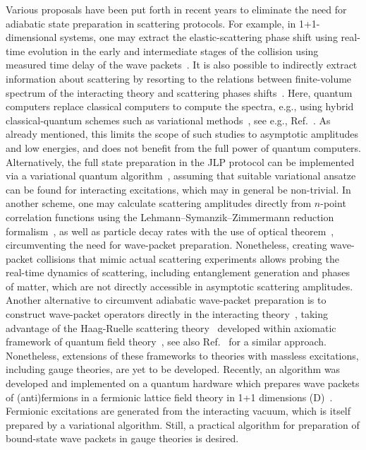 \documentclass[a4paper,onecolumn,11pt,accepted=2024-10-11]{quantumarticle}
\begin{document}
Various proposals have been put forth in recent years to eliminate the need for adiabatic state preparation in scattering protocols. For example, in 1+1-dimensional systems, one may extract the elastic-scattering phase shift using real-time evolution in the early and intermediate stages of the collision using measured time delay of the wave packets~\cite{Gustafson:2021imb}. It is also possible to indirectly extract information about scattering by resorting to the relations between finite-volume spectrum of the interacting theory and scattering phases shifts~\cite{Luscher:1986pf,Luscher:1990ux,Luu:2010hw}. Here, quantum computers replace classical computers to compute the spectra, e.g., using hybrid classical-quantum schemes such as variational methods~\cite{Peruzzo:2013bzg,McClean:2015vup,Tilly:2021jem}, see e.g., Ref.~\cite{Sharma:2023bqu}. As already mentioned, this limits the scope of such studies to asymptotic amplitudes and low energies, and does not benefit from the full power of quantum computers. Alternatively, the full state preparation in the JLP protocol can be implemented via a variational quantum algorithm~\cite{Liu:2021otn}, assuming that suitable variational ansatze can be found for interacting excitations, which may in general be non-trivial. In another scheme, one may calculate scattering amplitudes directly from $n$-point correlation functions using the Lehmann–Symanzik–Zimmermann reduction formalism~\cite{Li:2023kex,Briceno:2023xcm,Briceno:2020rar}, as well as particle decay rates with the use of optical theorem~\cite{Ciavarella:2020vqm}, circumventing the need for wave-packet preparation. Nonetheless, creating wave-packet collisions that mimic actual scattering experiments allows probing the real-time dynamics of scattering, including entanglement generation and phases of matter, which are not directly accessible in asymptotic scattering amplitudes. Another alternative to circumvent adiabatic wave-packet preparation is to construct wave-packet operators directly in the interacting theory~\cite{Turco:2023rmx}, taking advantage of the Haag-Ruelle scattering theory~\cite{Haag:1958vt,Ruelle1962} developed within axiomatic framework of quantum field theory~\cite{Duncan:2012aja}, see also Ref.~\cite{Kreshchuk:2023btr} for a similar approach. Nonetheless, extensions of these frameworks to theories with massless excitations, including gauge theories, are yet to be developed. Recently, an algorithm was developed and implemented on a quantum hardware which prepares wave packets of (anti)fermions in a fermionic lattice field theory in 1+1 dimensions (D)~\cite{Chai:2023qpq}. Fermionic excitations are generated from the interacting vacuum, which is itself prepared by a variational algorithm. Still, a practical algorithm for preparation of bound-state wave packets in gauge theories is desired.
\end{document}
